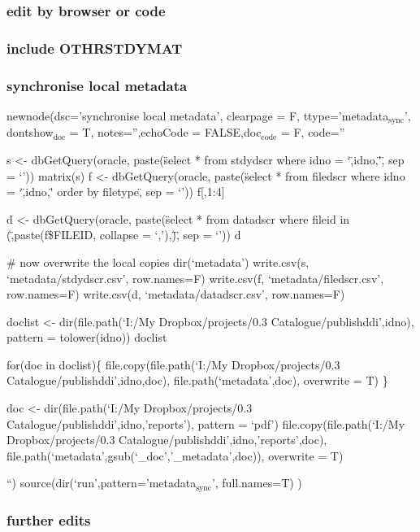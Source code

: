 \documentclass[a4paper]{article}
\begin{document}
\subsubsection{edit by browser or code}
\label{sec-10-8-5}
\subsubsection{include OTHRSTDYMAT}
\label{sec-10-8-6}
\subsubsection{synchronise local metadata}
\label{sec-10-8-7}


newnode(dsc='synchronise local metadata', clearpage = F, ttype='metadata$_{\mathrm{sync}}$',
 dontshow$_{\mathrm{doc}}$ = T, notes='',echoCode = FALSE,doc$_{\mathrm{code}}$ = F,
 code=''
 
 s <- dbGetQuery(oracle, paste(\"select * from stdydscr where idno = `\",idno,\"'\", sep = `'))
 matrix(s)
 f <- dbGetQuery(oracle, paste(\"select * from filedscr where idno = `\",idno,\"' order by filetype\", sep = `'))
 f[,1:4]

 d <- dbGetQuery(oracle, paste(\"select * from datadscr where fileid in (\",paste(f\$FILEID, collapse = `,'),\")\", sep = `'))
 d

 \# now overwrite the local copies
 dir(`metadata')
 write.csv(s, `metadata/stdydscr.csv', row.names=F)
 write.csv(f, `metadata/filedscr.csv', row.names=F)
 write.csv(d, `metadata/datadscr.csv', row.names=F)


 doclist <- dir(file.path(`I:/My Dropbox/projects/0.3 Catalogue/publishddi',idno), pattern = tolower(idno))
 doclist
 
 for(doc in doclist)\{
 file.copy(file.path(`I:/My Dropbox/projects/0.3 Catalogue/publishddi',idno,doc), file.path(`metadata',doc), overwrite = T)
 \}
 
 doc <- dir(file.path(`I:/My Dropbox/projects/0.3 Catalogue/publishddi',idno,'reports'), pattern = `pdf')
 file.copy(file.path(`I:/My Dropbox/projects/0.3 Catalogue/publishddi',idno,'reports',doc), file.path(`metadata',gsub(`_doc','_metadata',doc)), overwrite = T)
 
 ``)
source(dir(`run',pattern='metadata$_{\mathrm{sync}}$', full.names=T) )
\subsubsection{further edits}
\label{sec-10-8-8}
\end{document}
